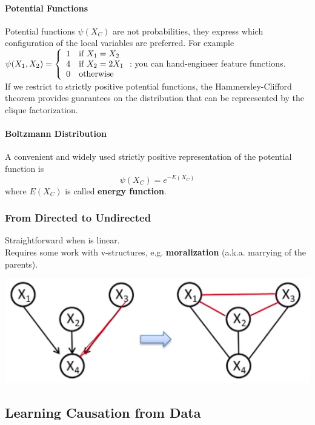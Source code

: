 \documentclass[10pt]{report}
\begin{document}
\paragraph{Potential Functions} Potential functions $\psi(X_C)$ are not probabilities, they express which configuration of the local variables are preferred. For example $\psi(X_1,X_2)=\left\{ \begin{array}{l l}
1&\text{if }X_1 = X_2\\
4&\text{if }X_2 = 2X_1\\
0&\text{otherwise}
\end{array}\right.$: you can hand-engineer feature functions.\\
If we restrict to strictly positive potential functions, the Hammersley-Clifford theorem provides guarantees on the distribution that can be repreesented by the clique factorization.
\paragraph{Boltzmann Distribution} A convenient and widely used strictly positive representation of the potential function is $$\psi(X_C)=e^{-E(X_C)}$$
where $E(X_C)$ is called \textbf{energy function}.
\subsubsection{From Directed to Undirected}
Straightforward when is linear.\\Requires some work with v-structures, e.g. \textbf{moralization} (a.k.a. marrying of the parents).\begin{center}
	\includegraphics[scale=0.5]{25.png}
\end{center}
\subsection{Learning Causation from Data}
\end{document}
